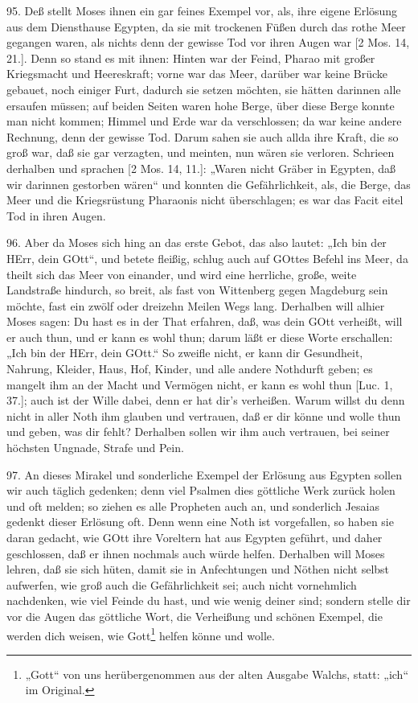 95. Deß stellt Moses ihnen ein gar feines Exempel vor, als, ihre eigene Erlösung aus dem Diensthause Egypten, da sie mit trockenen Füßen durch das rothe Meer gegangen waren, als nichts denn der gewisse Tod vor ihren Augen war [2 Mos. 14, 21.]. Denn so stand es mit ihnen: Hinten war der Feind, Pharao mit großer Kriegsmacht und Heereskraft; vorne war das Meer, darüber war keine Brücke gebauet, noch einiger Furt, dadurch sie setzen möchten, sie hätten darinnen alle ersaufen müssen; auf beiden Seiten waren hohe Berge, über diese Berge konnte man nicht kommen; Himmel und Erde war da verschlossen; da war keine andere Rechnung, denn der gewisse Tod. Darum sahen sie auch allda ihre Kraft, die so groß war, daß sie gar verzagten, und meinten, nun wären sie verloren. Schrieen derhalben und sprachen [2 Mos. 14, 11.]: „Waren nicht Gräber in Egypten, daß wir darinnen gestorben wären“ und konnten die Gefährlichkeit, als, die Berge, das Meer und die Kriegsrüstung Pharaonis nicht überschlagen; es war das Facit eitel Tod in ihren Augen.

96. Aber da Moses sich hing an das erste Gebot, das also lautet: „Ich bin der HErr, dein GOtt“, und betete fleißig, schlug auch auf GOttes Befehl ins Meer, da theilt sich das Meer von einander, und wird eine herrliche, große, weite Landstraße hindurch, so breit, als fast von Wittenberg gegen Magdeburg sein möchte, fast ein zwölf oder dreizehn Meilen Wegs lang. Derhalben will alhier Moses sagen: Du hast es in der That erfahren, daß, was dein GOtt verheißt, will er auch thun, und er kann es wohl thun; darum läßt er diese Worte erschallen: „Ich bin der HErr, dein GOtt.“ So zweifle nicht, er kann dir Gesundheit, Nahrung, Kleider, Haus, Hof, Kinder, und alle andere Nothdurft geben; es mangelt ihm an der Macht und Vermögen nicht, er kann es wohl thun [Luc. 1, 37.]; auch ist der Wille dabei, denn er hat dir’s verheißen. Warum willst du denn nicht in aller Noth ihm glauben und vertrauen, daß er dir könne und wolle thun und geben, was dir fehlt? Derhalben sollen wir ihm auch vertrauen, bei seiner höchsten Ungnade, Strafe und Pein.

97. An dieses Mirakel und sonderliche Exempel der Erlösung aus Egypten sollen wir auch täglich gedenken; denn viel Psalmen dies göttliche Werk zurück holen und oft melden; so ziehen es alle Propheten auch an, und sonderlich Jesaias gedenkt dieser Erlösung oft. Denn wenn eine Noth ist vorgefallen, so haben sie daran gedacht, wie GOtt ihre Voreltern hat aus Egypten geführt, und daher geschlossen, daß er ihnen nochmals auch würde helfen. Derhalben will Moses lehren, daß sie sich hüten, damit sie in Anfechtungen und Nöthen nicht selbst aufwerfen, wie groß auch die Gefährlichkeit sei; auch nicht vornehmlich nachdenken, wie viel Feinde du hast, und wie wenig deiner sind; sondern stelle dir vor die Augen das göttliche Wort, die Verheißung und schönen Exempel, die werden dich weisen, wie Gott\footnote{„Gott“ von uns herübergenommen aus der alten Ausgabe Walchs, statt: „ich“ im Original.} helfen könne und wolle.


